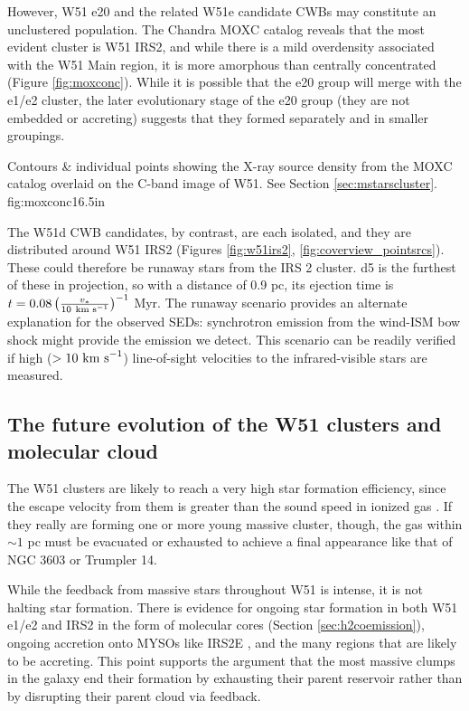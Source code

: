 However, W51 e20 and the related W51e candidate CWBs may constitute an
unclustered population.  The Chandra MOXC catalog \citep{Townsley2014a} reveals
that the most evident cluster is W51 IRS2, and while there is a mild
overdensity associated with the W51 Main region, it is more amorphous than
centrally concentrated (Figure \ref{fig:moxconc}).  While it is possible that
the e20 group will merge with the e1/e2 cluster, the later evolutionary stage
of the e20 group (they are not embedded or accreting) suggests that they formed
separately and in smaller groupings.

{Contours \& individual points showing the X-ray source density from the 
MOXC \citep{Townsley2014a} catalog overlaid on the C-band image of W51.
See Section \ref{sec:mstarscluster}.}
{fig:moxconc}{1}{6.5in}

The W51d CWB candidates, by contrast, are each isolated, and they are
distributed around W51 IRS2 (Figures \ref{fig:w51irs2},
\ref{fig:coverview_pointsrcs}).  These could therefore be runaway stars from
the IRS 2 cluster.  d5 is the furthest of these in projection, so with a
distance of 0.9 pc, its ejection time is $t = 0.08 \left(\frac{v_*}{10
~\textrm{km~s}^{-1}}\right)^{-1}$ Myr.  The runaway scenario provides an alternate
explanation for the observed SEDs: synchrotron emission from the wind-ISM
bow shock might provide the emission we detect.  This scenario can be readily
verified if high ($>10~\textrm{km~s}^{-1}$) line-of-sight velocities to the infrared-visible
stars are measured.


\subsection{The future evolution of the W51 clusters and molecular cloud}
The W51 clusters are likely to reach a very high star formation efficiency,
since the escape velocity from them is greater than the sound speed in ionized gas
\citep{Ginsburg2012a,Bressert2012a}.  If they really are forming one or more
young massive cluster, though, the gas within $\sim 1$ pc must be evacuated or
exhausted to achieve a final appearance like that of NGC 3603 or Trumpler 14.


While the feedback from massive stars throughout W51 is intense, it is not
halting star formation.  There is evidence for ongoing star formation in both
W51 e1/e2 and IRS2 in the form of molecular cores (Section
\ref{sec:h2coemission}), ongoing accretion onto MYSOs like IRS2E
\citep{Figueredo2008a}, and the many \hchii regions that are likely to be
accreting.    This point supports the \citet{Matzner2015a} argument that the
most massive clumps in the galaxy  end their formation by exhausting their
parent reservoir rather than by disrupting their parent cloud via feedback.

